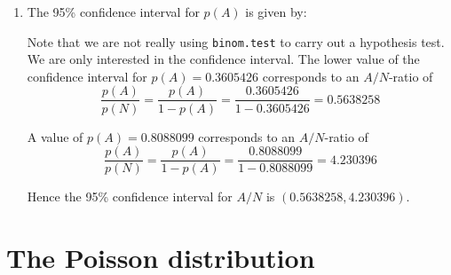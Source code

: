 \begin{enumerate}
\item\label{it:binomtest} The 95\% confidence interval for $p(A)$ is
  given by:


Note that we are not really using \texttt{binom.test} to carry out a
hypothesis test. We are only interested in the confidence interval.
The lower value of the confidence interval for $p(A)=0.3605426$
corresponds to an $A/N$-ratio of
\[
\frac{p(A)}{p(N)} = \frac{p(A)}{1-p(A)} =
\frac{0.3605426}{1-0.3605426} = 0.5638258
\]

A value of $p(A)=0.8088099$ corresponds to an $A/N$-ratio of
\[
\frac{p(A)}{p(N)} = \frac{p(A)}{1-p(A)} =
\frac{0.8088099}{1-0.8088099} = 4.230396
\]

Hence the 95\% confidence interval for $A/N$ is
$(0.5638258,4.230396)$.

\end{enumerate}
  
\section{The Poisson distribution}
\label{sec:sol-poisson}

